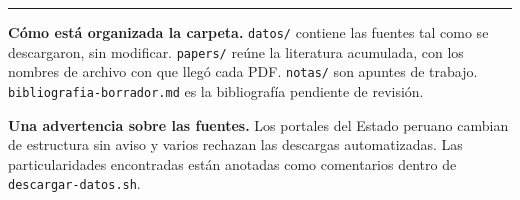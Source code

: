 \documentclass[11pt,a4paper]{article}
\begin{document}
\vspace{1.5em}
\hrule
\vspace{0.8em}

{\small\color{gris}
\textbf{Cómo está organizada la carpeta.}
\texttt{datos/} contiene las fuentes tal como se descargaron, sin modificar.
\texttt{papers/} reúne la literatura acumulada, con los nombres de archivo con
que llegó cada PDF. \texttt{notas/} son apuntes de trabajo.
\texttt{bibliografia-borrador.md} es la bibliografía pendiente de revisión.

\textbf{Una advertencia sobre las fuentes.} Los portales del Estado peruano
cambian de estructura sin aviso y varios rechazan las descargas automatizadas.
Las particularidades encontradas están anotadas como comentarios dentro de
\texttt{descargar-datos.sh}.
}
\end{document}
